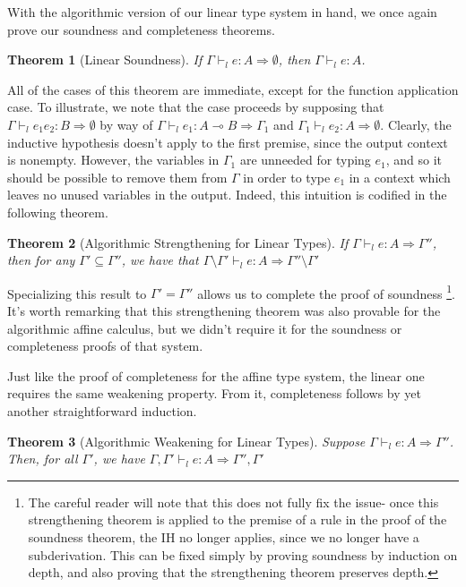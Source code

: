 \documentclass{article}
\newtheorem{theorem}{Theorem}
\theoremstyle{definition}
\newcommand{\loli}{\multimap}
\newcommand{\gens}{\Rightarrow}
\begin{document}
With the algorithmic version of our linear type system in hand, we once again prove our soundness and completeness theorems.

\begin{theorem}[Linear Soundness]
If $\Gamma \vdash_l e : A \gens \emptyset$, then $\Gamma \vdash_l e : A$.
\end{theorem}

All of the cases of this theorem are immediate, except for the function application case. To illustrate, we note that the case proceeds by supposing that $\Gamma \vdash_l e_1 e_2 : B \gens \emptyset$ by way of $\Gamma \vdash_l e_1 : A \loli B \gens \Gamma_1$ and $\Gamma_1 \vdash_l e_2 : A \gens \emptyset$. Clearly, the inductive hypothesis doesn't apply to the first premise, since the output context is nonempty. However, the variables in $\Gamma_1$ are unneeded for typing $e_1$, and so it should be possible to remove them from $\Gamma$ in order to type $e_1$ in a context which leaves no unused variables in the output. Indeed, this intuition is codified in the following theorem.

\begin{theorem}[Algorithmic Strengthening for Linear Types]
If $\Gamma \vdash_l e : A \gens \Gamma''$, then for any $\Gamma' \subseteq \Gamma''$, we have that $\Gamma \setminus \Gamma' \vdash_l e : A \gens \Gamma'' \setminus \Gamma'$
\end{theorem}

Specializing this result to $\Gamma' = \Gamma''$ allows us to complete the proof of soundness
\footnote{The careful reader will note that this does not fully fix the issue- once this strengthening theorem is applied to the premise of a rule in the proof of the soundness theorem, the IH no longer applies, since we no longer have a subderivation. This can be fixed simply by proving soundness by induction on depth, and also proving that the strengthening theorem preserves depth.}.
It's worth remarking that this strengthening theorem was also provable for the algorithmic affine calculus, but we didn't require it for the soundness or completeness proofs of that system.

Just like the proof of completeness for the affine type system, the linear one requires the same weakening property. From it, completeness follows by yet another straightforward induction.

\begin{theorem}[Algorithmic Weakening for Linear Types]
Suppose $\Gamma \vdash_l e : A \gens \Gamma''$. Then, for all $\Gamma'$, we have $\Gamma,\Gamma' \vdash_l e : A \gens \Gamma'', \Gamma'$
\end{theorem}
\end{document}
